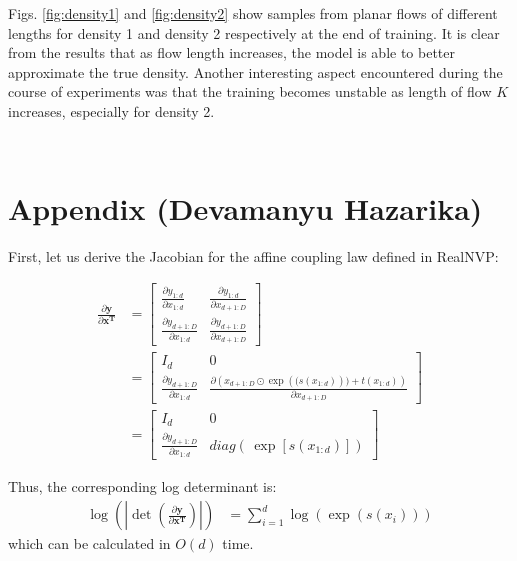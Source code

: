 \documentclass[runningheads]{llncs}
\newenvironment{code}{\captionsetup{type=listing}}{}
\begin{document}
Figs. \ref{fig:density1} and \ref{fig:density2} show samples from planar flows of different lengths for density 1 and density 2 respectively at the end of training. It is clear from the results that as flow length increases, the model is able to better approximate the true density. Another interesting aspect encountered during the course of experiments was that the training becomes unstable as length of flow $K$ increases, especially for density 2. 

\begin{code}
	\inputminted[linenos=true,frame=lines,framesep=2mm]{python}{metropolis.py}
	\label{code:mh}
\end{code}
\begin{code}
	\inputminted[linenos=true,frame=lines,framesep=2mm]{python}{planar.py}
	\label{code:planar}
\end{code}

\section{Appendix (Devamanyu Hazarika)}

First, let us derive the Jacobian for the affine coupling law defined in RealNVP:

\begin{align*}
\frac{\partial \mathbf{y}}{\partial \mathbf{x^T}} &= \begin{bmatrix}
\frac{\partial y_{1:d}}{\partial x_{1:d}} & \frac{\partial y_{1:d}}{\partial x_{d+1:D}} \\
\frac{\partial y_{d+1:D}}{\partial x_{1:d}} & \frac{\partial y_{d+1:D}}{\partial x_{d+1:D}} 
\end{bmatrix}\\
&= \begin{bmatrix}
I_{d} & 0 \\
\frac{\partial y_{d+1:D}}{\partial x_{1:d}} & \frac{\partial \left(x_{d+1:D} \odot \exp\left((s(x_{1:d})\right)) + t(x_{1:d})\right)}{\partial x_{d+1:D}} 
\end{bmatrix}\\
&= \begin{bmatrix}
I_{d} & 0 \\
\frac{\partial y_{d+1:D}}{\partial x_{1:d}} & diag\left(\,\exp[s(x_{1:d})]\right)
\end{bmatrix}
\end{align*}

Thus, the corresponding log determinant is:
\begin{align*}
\log\left( \left|\det(\frac{\partial \mathbf{y}}{\partial \mathbf{x^T}})\right|\right) &= \sum_{i=1}^{d}{\log(\exp(s(x_i)))}
\end{align*}
which can be calculated in $O(d)$ time.
\end{document}
